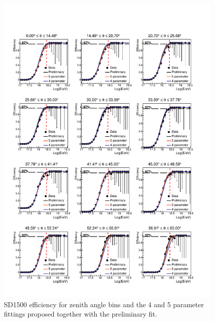 \documentclass[12pt,a4paper]{article}
\begin{document}
\begin{figure}[]
\center
\includegraphics[width=0.99\textwidth]{plots/EfficiencyZenith.pdf}
\caption{SD1500 efficiency for zenith angle bins and the 4 and 5 parameter fittings proposed together with the preliminary fit.
\label{fig:zenith}}
\end{figure}
\end{document}
